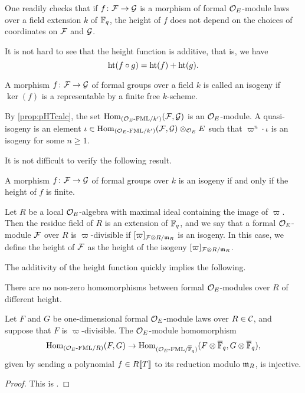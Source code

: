 \documentclass[../main.tex]{subfiles}
\begin{document}
One readily checks that if $f\colon  \mathcal{F} \to \mathcal{G}$ is a morphism of formal
$\mathcal{O}_E$-module laws over a field extension $k$ of $\mathbb{F}_q$, the height of $f$
does not depend on the choices of coordinates on $\mathcal{F}$ and $\mathcal{G}$. 

It is not hard to see that the height function is additive, that is, we have
\begin{equation*}
  \textnormal{ht}(f \circ g) = \textnormal{ht}(f) + \textnormal{ht}(g).
\end{equation*}

\begin{defi}
  A morphism $f\colon  \mathcal{F} \to \mathcal{G}$ of formal groups over a field $k$ is called
  an isogeny if $\ker(f)$ is a representable by a finite free $k$-scheme. 

  By \cref{prop:pHTcalc}, the set $\operatorname{Hom}_{{({\mathcal{O}_E}\textnormal-\allowbreak\mathrm{FML}/{k'})}}(\mathcal{F}, \mathcal{G})$ is an 
  $\mathcal{O}_E$-module. A quasi-isogeny is an element $\iota \in \operatorname{Hom}_{{({\mathcal{O}_E}\textnormal-\allowbreak\mathrm{FML}/{k'})}}(\mathcal{F}, \mathcal{G}) \otimes_{\mathcal{O}_E} E$ such that 
  $\varpi^n \cdot \iota$ is an isogeny for some $n \geq 1$. 
\end{defi}

It is not difficult to verify the following result. 
\begin{lem}
  A morphism $f\colon  \mathcal{F} \to \mathcal{G}$ of formal groups over $k$
  is an isogeny if and only if the height of $f$ is finite. 
\end{lem}

\begin{defi}
  Let $R$ be a local $\mathcal{O}_E$-algebra with maximal ideal containing the 
  image of $\varpi$.
  Then the residue field of $R$ is an extension of 
  $\mathbb{F}_q$, and we say that a formal $\mathcal{O}_E$-module $\mathcal{F}$ over $R$ is
  $\varpi$-divisible if 
  $[\varpi]_{\mathcal{F} \otimes R/\mathfrak{m}_R}$ is an isogeny. In this case, we define the
  height of $\mathcal{F}$
  as the height of the isogeny $[\varpi]_{\mathcal{F} \otimes R/\mathfrak{m}_R}$.
\end{defi}

The additivity of the height function quickly implies the following.

\begin{lem}\label{lem:NoNonzeroHomsBetweenDiffHeight}
  There are no non-zero homomorphisms between formal $\mathcal{O}_E$-modules 
  over $R$ of different height.
\end{lem}

\begin{prop}\label{prop:ReductionOfHomsIsInjective}
  Let $F$ and $G$ be one-dimensional formal $\mathcal{O}_E$-module laws over $R \in \mathcal{C}$,
  and suppose that $F$ is $\varpi$-divisible.
  The $\mathcal{O}_E$-module homomorphism
  \begin{equation*}
    \operatorname{Hom}_{{({\mathcal{O}_E}\textnormal-\allowbreak\mathrm{FML}/{R})}} (F,G) \to \operatorname{Hom}_{{({\mathcal{O}_E}\textnormal-\allowbreak\mathrm{FML}/{{\overline {\mathbb{F}}_q}})}}(F \otimes {\overline{\mathbb{F}}_q}
    , G \otimes {\overline{\mathbb{F}}_q}),
  \end{equation*}
  given by sending a polynomial $f \in R\llbracket T \rrbracket$ to its reduction modulo
  $\mathfrak{m}_R$, is injective.
\begin{proof}
  This is \cite[Proposition 4.2]{hopkins1994equivariant}.
\end{proof}
\end{prop}
\end{document}
